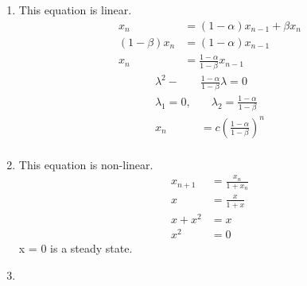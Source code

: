 
\begin{homeworkProblem}[1]
\begin{enumerate}
    \item This equation is linear.
    \[
        \begin{aligned}
        x_n &= (1-\alpha) x_{n-1} + \beta x_n \\
        (1 - \beta) x_n &= (1 - \alpha) x_{n-1} \\
        x_n &= \frac{1 - \alpha}{1 - \beta} x_{n-1}
        \end{aligned}
    \]
    \[
        \begin{aligned}
        \lambda^2 - & \frac{1 - \alpha}{1 - \beta} \lambda = 0 \\
        \lambda_1 = 0, &\quad \lambda_2 = \frac{1 - \alpha}{1 - \beta} \\
        x_n &= c(\frac{1 - \alpha}{1 - \beta})^n \\
        \end{aligned}
    \]

    \item This equation is non-linear.
    \[
        \begin{aligned}
        x_{n+1} &= \frac{x_n}{1 + x_n} \\
        x &= \frac{x}{1 + x}  \\
        x + x^2 &= x \\
        x^2 &= 0
        \end{aligned}
    \]
    x = 0 is a steady state.

    \item
\end{enumerate}
\end{homeworkProblem}